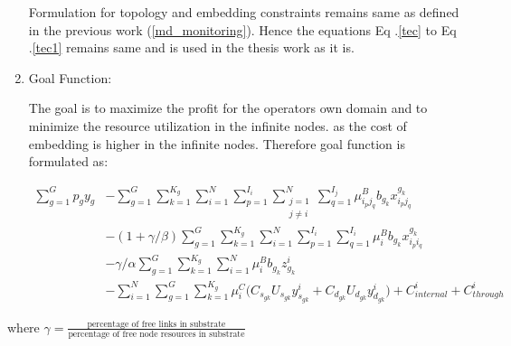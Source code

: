 \documentclass[article,dr=phil,type=msc ,colorback,accentcolor=tud4b]{tudthesis}
\begin{document}
\begin{enumerate}[label=(\Alph*)]
Formulation for topology and embedding constraints remains same as defined in the previous work (\ref{md_monitoring}). Hence the equations Eq .\ref{tec} to Eq .\ref{tec1} remains same and is used in the thesis work as it is.


\item Goal Function:

The goal is to maximize the profit for the operators own domain and to minimize the resource utilization in the infinite nodes. as the cost of embedding is higher in the infinite nodes. Therefore goal function is formulated as:

\begin{equation} \label{part_enb_goal}
\begin{aligned}
\sum_{g=1}^{G} p_{g} y_{g} &- \sum_{g=1}^{G} \sum_{k=1}^{K_{g}}  \sum_{i=1}^{N} \sum_{p=1}^{I_{i}} \sum_{\substack{j=1 \\ j\neq i}}^{N} \sum_{q=1}^{I_{j}} \mu^{B}_{i_{p}j_{q}} b_{g_{k}} x^{g_{k}}_{i_{p}j_{q}}\\ &- (1+\gamma/\beta) \sum_{g=1}^{G} \sum_{k=1}^{K_{g}}  \sum_{i=1}^{N} \sum_{p=1}^{I_{i}} \sum_{q=1}^{I_{i}}  \mu^{B}_{i} b_{g_{k}}  x^{g_{k}}_{i_{p}i_{q}}\\ &- \gamma/\alpha \sum_{g=1}^{G} \sum_{k=1}^{K_{g}}  \sum_{i=1}^{N}  \mu^{B}_{i} b_{g_{k}} z_{g_{k}}^{i} \\ &- \sum_{i=1}^{N} \sum_{g=1}^{G} \sum_{k=1}^{K_{g}} \mu^{C}_{i}  \big( C_{s_{gk}} U_{s_{gk}}  y^{i}_{s_{gk}} +  C_{d_{gk}} U_{d_{gk}} y^{i}_{d_{gk}} \big) + C_{internal}^{i} + C_{through}^{i}
\end{aligned}
\end{equation}
\end{enumerate}
where $\gamma = \frac{\text{percentage of free links in substrate}}{\text{percentage of free node resources in substrate}}$ \newline
\end{document}

